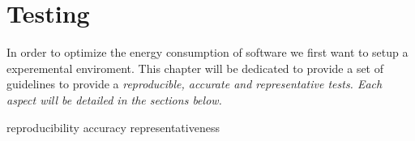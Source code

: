 \newpage

\chapter{Testing}
\label{chapter:testing}

In order to optimize the energy consumption of software we first want to setup a experemental enviroment. This chapter will be dedicated to provide a set of guidelines to provide a \em{reproducible, accurate} and \em{representative} tests.
Each aspect will be detailed in the sections below. 

{reproducibility}
{accuracy}
{representativeness}
